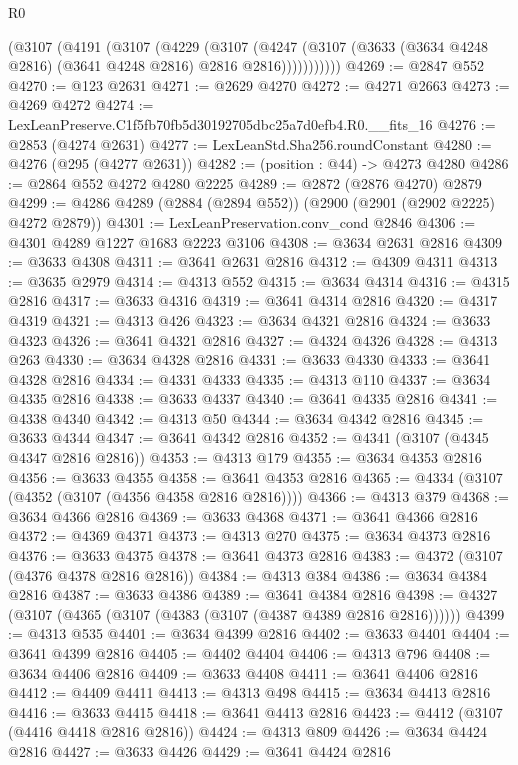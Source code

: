 \begin{lexlean}{R0}
\begin{coremodule}
          (@3107
            (@4191
              (@3107
                (@4229
                  (@3107
                    (@4247
                      (@3107 (@3633 (@3634 @4248 @2816) (@3641 @4248 @2816) @2816 @2816)))))))))))
@4269 := @2847 @552
@4270 := @123 @2631
@4271 := @2629 @4270
@4272 := @4271 @2663
@4273 := @4269 @4272
@4274 := LexLeanPreserve.C1f5fb70fb5d30192705dbc25a7d0efb4.R0.__fits_16
@4276 := @2853 (@4274 @2631)
@4277 := LexLeanStd.Sha256.roundConstant
@4280 := @4276 (@295 (@4277 @2631))
@4282 := (position : @44) -> @4273 @4280
@4286 := @2864 @552 @4272 @4280 @2225
@4289 := @2872 (@2876 @4270) @2879
@4299 := @4286 @4289 (@2884 (@2894 @552)) (@2900 (@2901 (@2902 @2225) @4272 @2879))
@4301 := LexLeanPreservation.conv_cond @2846
@4306 := @4301 @4289 @1227 @1683 @2223 @3106
@4308 := @3634 @2631 @2816
@4309 := @3633 @4308
@4311 := @3641 @2631 @2816
@4312 := @4309 @4311
@4313 := @3635 @2979
@4314 := @4313 @552
@4315 := @3634 @4314
@4316 := @4315 @2816
@4317 := @3633 @4316
@4319 := @3641 @4314 @2816
@4320 := @4317 @4319
@4321 := @4313 @426
@4323 := @3634 @4321 @2816
@4324 := @3633 @4323
@4326 := @3641 @4321 @2816
@4327 := @4324 @4326
@4328 := @4313 @263
@4330 := @3634 @4328 @2816
@4331 := @3633 @4330
@4333 := @3641 @4328 @2816
@4334 := @4331 @4333
@4335 := @4313 @110
@4337 := @3634 @4335 @2816
@4338 := @3633 @4337
@4340 := @3641 @4335 @2816
@4341 := @4338 @4340
@4342 := @4313 @50
@4344 := @3634 @4342 @2816
@4345 := @3633 @4344
@4347 := @3641 @4342 @2816
@4352 := @4341 (@3107 (@4345 @4347 @2816 @2816))
@4353 := @4313 @179
@4355 := @3634 @4353 @2816
@4356 := @3633 @4355
@4358 := @3641 @4353 @2816
@4365 := @4334 (@3107 (@4352 (@3107 (@4356 @4358 @2816 @2816))))
@4366 := @4313 @379
@4368 := @3634 @4366 @2816
@4369 := @3633 @4368
@4371 := @3641 @4366 @2816
@4372 := @4369 @4371
@4373 := @4313 @270
@4375 := @3634 @4373 @2816
@4376 := @3633 @4375
@4378 := @3641 @4373 @2816
@4383 := @4372 (@3107 (@4376 @4378 @2816 @2816))
@4384 := @4313 @384
@4386 := @3634 @4384 @2816
@4387 := @3633 @4386
@4389 := @3641 @4384 @2816
@4398 := @4327 (@3107 (@4365 (@3107 (@4383 (@3107 (@4387 @4389 @2816 @2816))))))
@4399 := @4313 @535
@4401 := @3634 @4399 @2816
@4402 := @3633 @4401
@4404 := @3641 @4399 @2816
@4405 := @4402 @4404
@4406 := @4313 @796
@4408 := @3634 @4406 @2816
@4409 := @3633 @4408
@4411 := @3641 @4406 @2816
@4412 := @4409 @4411
@4413 := @4313 @498
@4415 := @3634 @4413 @2816
@4416 := @3633 @4415
@4418 := @3641 @4413 @2816
@4423 := @4412 (@3107 (@4416 @4418 @2816 @2816))
@4424 := @4313 @809
@4426 := @3634 @4424 @2816
@4427 := @3633 @4426
@4429 := @3641 @4424 @2816

\end{coremodule}
\end{lexlean}

